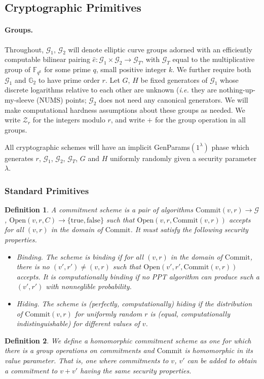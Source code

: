 \documentclass[letterpaper]{article}
\newtheorem{defn}{Definition}
\newcommand{\Commit}{\mathrm{Commit}}
\newcommand{\Open}{\mathrm{Open}}
\newcommand{\e}{\hat{e}}
\newcommand{\truth}{\{\mathrm{true}, \mathrm{false}\}}
\begin{document}
\subsection{Cryptographic Primitives}

\paragraph{Groups.} Throughout, $\mathcal{G}_1$, $\mathcal{G}_2$ will denote
elliptic curve groups adorned with an efficiently computable bilinear pairing
$\e:\mathcal{G}_1\times\mathcal{G}_2\to\mathcal{G}_T$, with $\mathcal{G}_T$
equal to the multiplicative group of $\mathbb{F}_{q^k}$ for some prime $q$,
small positive integer $k$. We further require both $\mathcal{G}_1$ and
$\mathbb{G}_2$ to have prime order $r$. Let $G$, $H$ be fixed generators of
$\mathcal{G}_1$ whose discrete logarithms relative to each other are unknown
(\emph{i.e.} they are nothing-up-my-sleeve (NUMS) points; $\mathcal{G}_2$
does not need any canonical generators. We will make computational hardness
assumptions about these groups as needed. We write $\mathcal{Z}_r$
for the integers modulo $r$, and write $+$ for the group operation in all
groups.

All cryptographic schemes will have an implicit \textrm{GenParams}$(1^\lambda)$
phase which generates $r$, $\mathcal{G}_1$, $\mathcal{G}_2$, $\mathcal{G}_T$,
$G$ and $H$ uniformly randomly given a security parameter $\lambda$.

\subsubsection{Standard Primitives}

\begin{defn} A \emph{commitment scheme} is a pair of algorithms
$\Commit(v, r)\to\mathcal{G}$, $\Open(v, r, C)\to\truth$ such that
$\Open(v, r, \Commit(v, r))$ accepts for all $(v, r)$ in the domain
of $\Commit$. It must satisfy the following security properties.
\begin{itemize}
\item \emph{Binding.} The scheme is \emph{binding} if for all $(v, r)$ in the
domain of $\Commit$, there is no $(v',r')\neq(v,r)$ such that
$\Open(v', r', \Commit(v, r))$ accepts.
It is \emph{computationally binding} if no PPT algorithm can produce such a
$(v', r')$ with nonneglible probability.
\item \emph{Hiding.} The scheme is \emph{(perfectly, computationally) hiding}
if the distribution of $\mathrm{Commit}(v, r)$ for uniformly random $r$ is
(equal, computationally indistinguishable) for different values of $v$.
\end{itemize}
\end{defn}
\begin{defn} We define a \emph{homomorphic commitment scheme} as one
for which there is a group operations on commitments and $\Commit$ is
homomorphic in its value parameter. That is, one where commitments to
$v$, $v'$ can be added to obtain a commitment to $v+v'$ having the
same security properties.
\end{defn}
\end{document}
